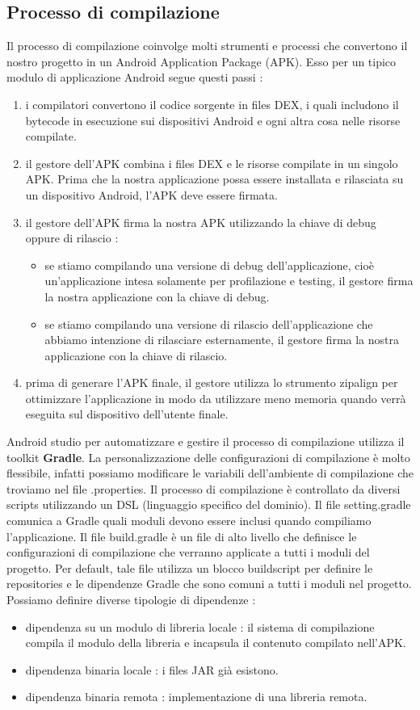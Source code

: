 \documentclass[12pt]{report}
\begin{document}
\subsection{Processo di compilazione}
Il processo di compilazione coinvolge molti strumenti e processi che convertono il nostro progetto in un Android Application Package (APK). Esso per un tipico modulo di applicazione Android segue questi passi :
\begin{enumerate}
\item i compilatori convertono il codice sorgente in files DEX, i quali includono il bytecode in esecuzione sui dispositivi Android e ogni altra cosa nelle risorse compilate.
\item il gestore dell'APK combina i files DEX e le risorse compilate in un singolo APK. Prima che la nostra applicazione possa essere installata e rilasciata su un dispositivo Android, l'APK deve essere firmata.
\item il gestore dell'APK firma la nostra APK utilizzando la chiave di debug oppure di rilascio :
\begin{itemize}
\item se stiamo compilando una versione di debug dell'applicazione, cioè un'applicazione intesa solamente per profilazione e testing, il gestore firma la nostra applicazione con la chiave di debug.
\item se stiamo compilando una versione di rilascio dell'applicazione che abbiamo intenzione di rilasciare esternamente, il gestore firma la nostra applicazione con la chiave di rilascio.
\end{itemize}
\item prima di generare l'APK finale, il gestore utilizza lo strumento zipalign per ottimizzare l'applicazione in modo da utilizzare meno memoria quando verrà eseguita sul dispositivo dell'utente finale.
\end{enumerate}
Android studio per automatizzare e gestire il processo di compilazione utilizza il toolkit \textbf{Gradle}. La personalizzazione delle configurazioni di compilazione è molto flessibile, infatti possiamo modificare le variabili dell'ambiente di compilazione che troviamo nel file .properties. Il processo di compilazione è controllato da diversi scripts utilizzando un DSL (linguaggio specifico del dominio). Il file setting.gradle comunica a Gradle quali moduli devono essere inclusi quando compiliamo l'applicazione. Il file build.gradle è un file di alto livello che definisce le configurazioni di compilazione che verranno applicate a tutti i moduli del progetto. Per default, tale file utilizza un blocco buildscript per definire le repositories e le dipendenze Gradle che sono comuni a tutti i moduli nel progetto. Possiamo definire diverse tipologie di dipendenze :
\begin{itemize}
\item dipendenza su un modulo di libreria locale : il sistema di compilazione compila il modulo della libreria e incapsula il contenuto compilato nell'APK.
\item dipendenza binaria locale : i files JAR già esistono.
\item dipendenza binaria remota : implementazione di una libreria remota.
\end{itemize}
\end{document}
